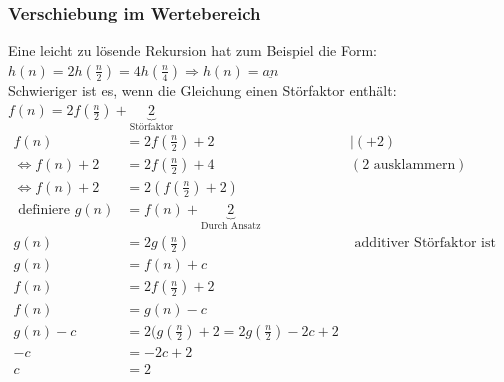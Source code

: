 \subsubsection*{Verschiebung im Wertebereich}
Eine leicht zu lösende Rekursion hat zum Beispiel die Form: $h(n) = 2h (\frac{n}{2}) = 4 h(\frac{n}{4}) \Rightarrow h(n)=\underline{an}$\\
Schwieriger ist es, wenn die Gleichung einen Störfaktor enthält:  $f(n)=2f(\frac {n}{2})+\underbrace{2}_{\text{Störfaktor}}$\\
\begin{align*}
    f(n)&=2f(\frac{n}{2})+2 &|(+2)\\
    \Leftrightarrow f(n)+2&= 2f(\frac{n}{2})+4 & (2\text{ ausklammern})\\
    \Leftrightarrow f(n)+2& = 2 (f(\frac{n}{2})+2)\\
    \text{ definiere } g(n)&=f(n)+\underbrace{2}_{\text{Durch Ansatz}}\\
    g(n)&=2 g(\frac{n}{2})&\text{ additiver Störfaktor ist weg.}\\
    g(n)&=f(n)+c\\
    f(n)&=2 f(\frac{n}{2})+2\\
    f(n)&=g(n)-c\\
    g(n)-c&= 2(g(\frac{n}{2})+2= 2 g(\frac{n}{2})-2c+2\\
    -c&=-2c+2\\
    c&=2\\
\end{align*}
